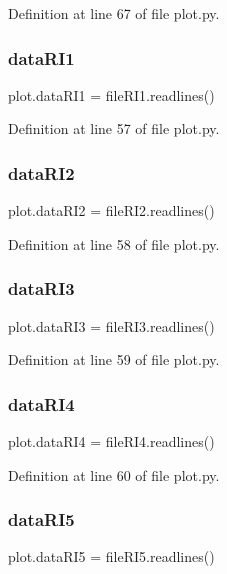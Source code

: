 Definition at line 67 of file plot.\+py.

\mbox{\label{namespaceplot_ac71465a54c0cc4f9b4b6980d8e0a53c2}} 
\subsubsection{data\+R\+I1}
{\footnotesize\ttfamily plot.\+data\+R\+I1 = file\+R\+I1.\+readlines()}



Definition at line 57 of file plot.\+py.

\mbox{\label{namespaceplot_a40828800b34e6fac4e010cc1af7c7853}} 
\subsubsection{data\+R\+I2}
{\footnotesize\ttfamily plot.\+data\+R\+I2 = file\+R\+I2.\+readlines()}



Definition at line 58 of file plot.\+py.

\mbox{\label{namespaceplot_a00a1afe274df0224bbf6598b7ceb4399}} 
\subsubsection{data\+R\+I3}
{\footnotesize\ttfamily plot.\+data\+R\+I3 = file\+R\+I3.\+readlines()}



Definition at line 59 of file plot.\+py.

\mbox{\label{namespaceplot_a4eccacb3908376dd102ebfe9d7d77aab}} 
\subsubsection{data\+R\+I4}
{\footnotesize\ttfamily plot.\+data\+R\+I4 = file\+R\+I4.\+readlines()}



Definition at line 60 of file plot.\+py.

\mbox{\label{namespaceplot_a92f503dd28a6a204b8129033503a96f9}} 
\subsubsection{data\+R\+I5}
{\footnotesize\ttfamily plot.\+data\+R\+I5 = file\+R\+I5.\+readlines()}



